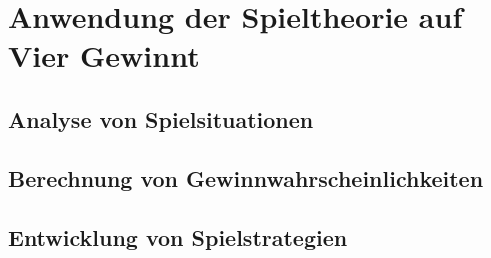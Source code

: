\chapter{Anwendung der Spieltheorie auf Vier Gewinnt}


\section{Analyse von Spielsituationen}
\section{Berechnung von Gewinnwahrscheinlichkeiten}
\section{Entwicklung von Spielstrategien}
	